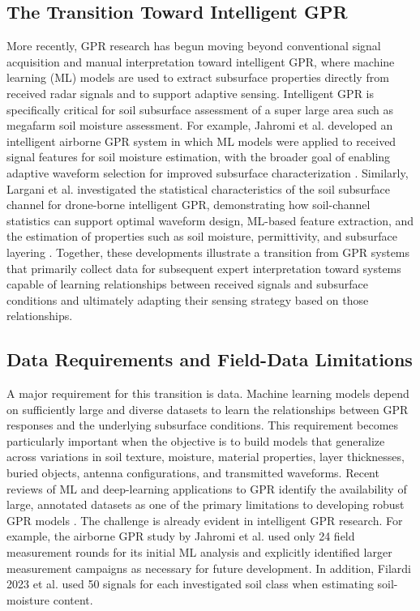 \documentclass[journal]{IEEEtran}
\begin{document}
\subsection{The Transition Toward Intelligent GPR}

More recently, GPR research has begun moving beyond conventional signal acquisition and manual interpretation toward intelligent GPR, where machine learning (ML) models are used to extract subsurface properties directly from received radar signals and to support adaptive sensing. Intelligent GPR is specifically critical for soil subsurface assessment of a super large area such as megafarm soil moisture assessment. For example, Jahromi et al. developed an intelligent airborne GPR system in which ML models were applied to received signal features for soil moisture estimation, with the broader goal of enabling adaptive waveform selection for improved subsurface characterization \cite{jahromi2024intelligent}. Similarly, Largani et al. investigated the statistical characteristics of the soil subsurface channel for drone-borne intelligent GPR, demonstrating how soil-channel statistics can support optimal waveform design, ML-based feature extraction, and the estimation of properties such as soil moisture, permittivity, and subsurface layering \cite{largani2024soil}. Together, these developments illustrate a transition from GPR systems that primarily collect data for subsequent expert interpretation toward systems capable of learning relationships between received signals and subsurface conditions and ultimately adapting their sensing strategy based on those relationships.

\subsection{Data Requirements and Field-Data Limitations}

A major requirement for this transition is data. Machine learning models depend on sufficiently large and diverse datasets to learn the relationships between GPR responses and the underlying subsurface conditions. This requirement becomes particularly important when the objective is to build models that generalize across variations in soil texture, moisture, material properties, layer thicknesses, buried objects, antenna configurations, and transmitted waveforms. Recent reviews of ML and deep-learning applications to GPR identify the availability of large, annotated datasets as one of the primary limitations to developing robust GPR models \cite{gprMLReview}. The challenge is already evident in intelligent GPR research. For example, the airborne GPR study by Jahromi et al. \cite{} used only 24 field measurement rounds for its initial ML analysis and explicitly identified larger measurement campaigns as necessary for future development. In addition, Filardi 2023 et al. \cite{} used 50 signals for each investigated soil class when estimating soil-moisture content.
\end{document}
